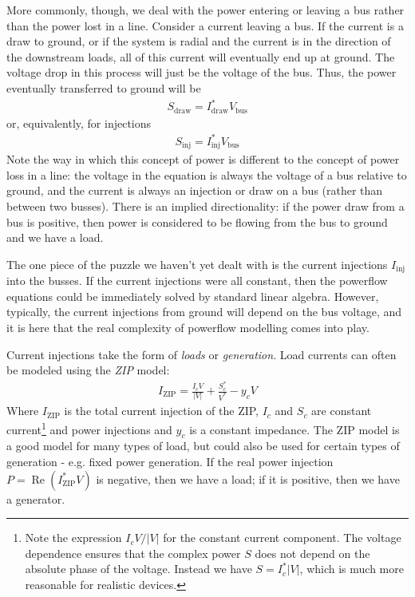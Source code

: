 \documentclass[11pt]{article}
\newcommand{\re}[1]{\ensuremath{\operatorname{Re}(#1)}}
\begin{document}
More commonly, though, we deal with the power entering or leaving a bus rather than the power lost in a line. Consider a current leaving a bus. If the current is a draw to ground, or if the system is radial and the current is in the direction of the downstream loads, all of this current will eventually end up at ground. The voltage drop in this process will just be the voltage of the bus. Thus, the power eventually transferred to ground will be 
\begin{align}
	S_\text{draw} = I_\text{draw}^*V_\text{bus}
\end{align}
or, equivalently, for injections
\begin{align}
	S_\text{inj} = I_\text{inj}^*V_\text{bus}
\end{align}
Note the way in which this concept of power is different to the concept of power loss in a line: the voltage in the equation is always the voltage of a bus relative to ground, and the current is always an injection or draw on a bus (rather than between two busses). There is an implied directionality: if the power draw from a bus is positive, then power is considered to be flowing from the bus to ground and we have a load.

The one piece of the puzzle we haven't yet dealt with is the current injections $I_\text{inj}$ into the busses. If the current injections were all constant, then the powerflow equations could be immediately solved by standard linear algebra. However, typically, the current injections from ground will depend on the bus voltage, and it is here that the real complexity of powerflow modelling comes into play.

Current injections take the form of \emph{loads} or \emph{generation}. Load currents can often be modeled using the \emph{ZIP} model:
\begin{align}
	I_\text{ZIP} = \frac{I_cV}{|V|} + \frac{S^*_c}{V^*} - y_cV
\end{align}
Where $I_\text{ZIP}$ is the total current injection of the ZIP, $I_c$ and $S_c$ are constant current\footnote{Note the expression $I_cV/|V|$ for the constant current component. The voltage dependence ensures that the complex power $S$ does not depend on the absolute phase of the voltage. Instead we have $S = I^*_c |V|$, which is much more reasonable for realistic devices.} and power injections and $y_c$ is a constant impedance. The ZIP model is a good model for many types of load, but could also be used for certain types of generation - e.g. fixed power generation. If the real power injection $P = \re{I_\text{ZIP}^*V}$ is negative, then we have a load; if it is positive, then we have a generator.
\end{document}
